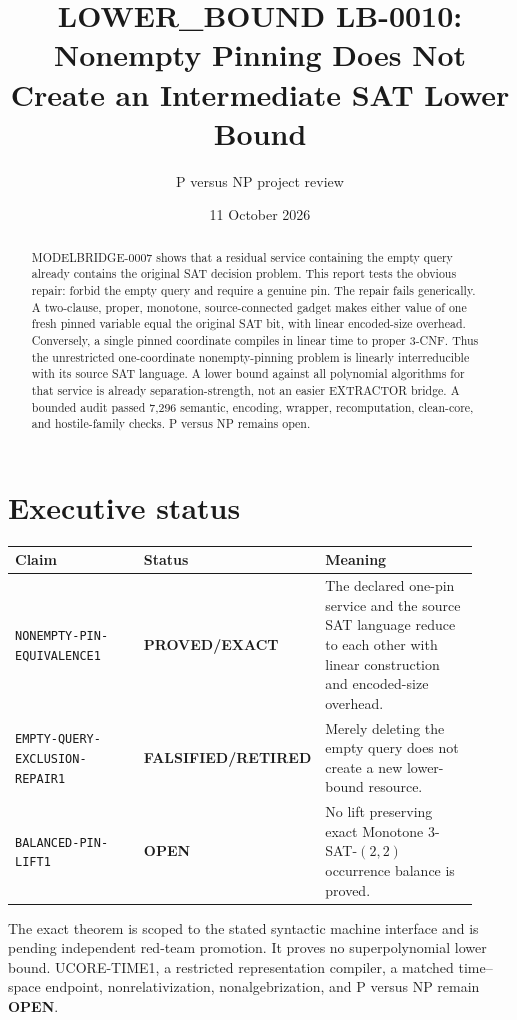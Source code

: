 \documentclass[11pt]{article}
\title{LOWER\_BOUND LB-0010:\\
Nonempty Pinning Does Not Create an Intermediate SAT Lower Bound}
\author{P versus NP project review}
\date{11 October 2026}
\newcommand{\EXACT}{\textbf{PROVED/EXACT}}
\newcommand{\OPEN}{\textbf{OPEN}}
\newcommand{\RETIRED}{\textbf{FALSIFIED/RETIRED}}
\begin{document}
\maketitle

\begin{abstract}
MODELBRIDGE-0007 shows that a residual service containing the empty query
already contains the original SAT decision problem.  This report tests the
obvious repair: forbid the empty query and require a genuine pin.  The repair
fails generically.  A two-clause, proper, monotone, source-connected gadget
makes either value of one fresh pinned variable equal the original SAT bit,
with linear encoded-size overhead.  Conversely, a single pinned coordinate
compiles in linear time to proper 3-CNF.  Thus the unrestricted one-coordinate
nonempty-pinning problem is linearly interreducible with its source SAT
language.  A lower bound against all polynomial algorithms for that service
is already separation-strength, not an easier EXTRACTOR bridge.  A bounded
audit passed 7,296 semantic, encoding, wrapper, recomputation, clean-core, and
hostile-family checks.  P versus NP remains open.
\end{abstract}

\section{Executive status}

\begin{center}
\small
\begin{tabular}{p{0.30\linewidth}p{0.24\linewidth}p{0.38\linewidth}}
\toprule
Claim & Status & Meaning\\
\midrule
\texttt{NONEMPTY-PIN-EQUIVALENCE1} & \EXACT &
The declared one-pin service and the source SAT language reduce to each other
with linear construction and encoded-size overhead.\\
\texttt{EMPTY-QUERY-EXCLUSION-REPAIR1} & \RETIRED &
Merely deleting the empty query does not create a new lower-bound resource.\\
\texttt{BALANCED-PIN-LIFT1} & \OPEN &
No lift preserving exact Monotone $3$-SAT-$(2,2)$ occurrence balance is proved.\\
\bottomrule
\end{tabular}
\end{center}

The exact theorem is scoped to the stated syntactic machine interface and is
pending independent red-team promotion.  It proves no superpolynomial lower
bound.  UCORE-TIME1, a restricted representation compiler, a matched
time--space endpoint, nonrelativization, nonalgebrization, and P versus NP
remain \OPEN.
\end{document}
